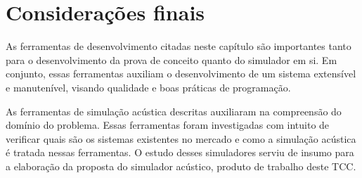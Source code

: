 \section{Considerações finais}

As ferramentas de desenvolvimento citadas neste capítulo são importantes tanto para o desenvolvimento da prova de conceito quanto do simulador em si. Em conjunto, essas ferramentas auxiliam o desenvolvimento de um sistema extensível e manutenível, visando qualidade e boas práticas de programação.

As ferramentas de simulação acústica descritas auxiliaram na compreensão do domínio do problema. Essas ferramentas foram investigadas com intuito de verificar quais são os sistemas existentes no mercado e como a simulação acústica é tratada nessas ferramentas. O estudo desses simuladores serviu de insumo para a elaboração da proposta do simulador acústico, produto de trabalho deste TCC.

